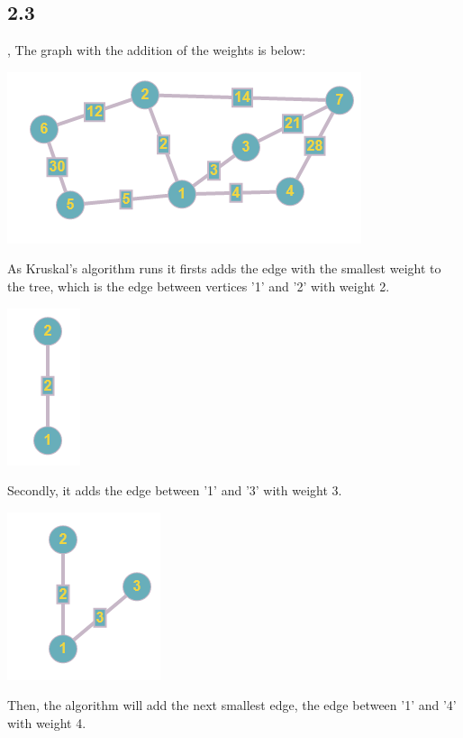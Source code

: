 \documentclass{article}
\begin{document}
\subsection*{2.3},
The graph with the addition of the weights is below:
\newline
\begin{center}
\includegraphics{b23W}
\end{center}
As Kruskal's algorithm runs it firsts adds the edge with the smallest weight to the tree, which is the edge between vertices '1' and '2' with weight 2. 
\newline
\begin{center}
\includegraphics{b231}
\end{center}
Secondly, it adds the edge between '1' and '3' with weight 3.
\newline
\begin{center}
\includegraphics{b232}
\end{center}
Then, the algorithm will add the next smallest edge, the edge between '1' and '4' with weight 4.
\newline
\end{document}

